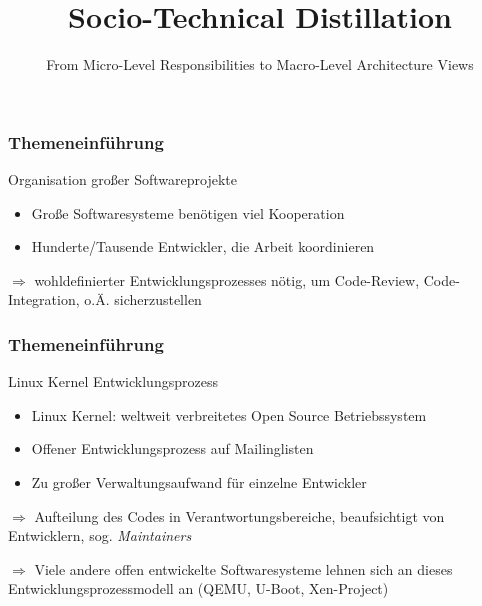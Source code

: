 \documentclass{beamer}
\title{Socio-Technical Distillation}
\subtitle{From Micro-Level Responsibilities to Macro-Level Architecture Views}
\begin{document}



	\begin{frame}
	\frametitle{Themeneinführung}
		\begin{block}{Organisation großer Softwareprojekte}
			\begin{itemize}
				\item Große Softwaresysteme benötigen viel Kooperation
				\item Hunderte/Tausende Entwickler, die Arbeit koordinieren
			\end{itemize}
		\end{block}

		$\Rightarrow$ wohldefinierter Entwicklungsprozesses nötig, um Code-Review, Code-Integration, o.Ä. sicherzustellen
	\end{frame}

	\begin{frame}
	\frametitle{Themeneinführung}
		\begin{block}{Linux Kernel Entwicklungsprozess}
			\begin{itemize}
				\item Linux Kernel: weltweit verbreitetes Open Source Betriebssystem
				\item Offener Entwicklungsprozess auf Mailinglisten
				\item Zu großer Verwaltungsaufwand für einzelne Entwickler
			\end{itemize}
		\end{block}
		\centering
		$\Rightarrow$ Aufteilung des Codes in Verantwortungsbereiche, beaufsichtigt von Entwicklern, sog. \textit{Maintainers}

		$\Rightarrow$ Viele andere offen entwickelte Softwaresysteme lehnen sich an dieses Entwicklungsprozessmodell an (QEMU, U-Boot, Xen-Project)
	\end{frame}
\end{document}
